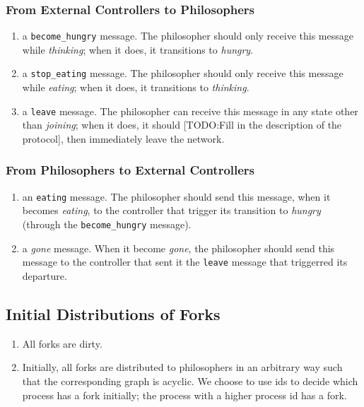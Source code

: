\documentclass[11pt]{article}
\begin{document}
\subsubsection{From External Controllers to Philosophers}
\begin{enumerate}
\item a \texttt{become\_hungry} message. The philosopher should only receive this message while \textit{thinking}; when it does, it transitions to \textit{hungry}.
\item a \texttt{stop\_eating} message. The philosopher should only receive this message while \textit{eating}; when it does, it transitions to \textit{thinking}.
\item a \texttt{leave} message. The philosopher can receive this message in any state other than \textit{joining}; when it does, it should [TODO:Fill in the description of the protocol], then immediately leave the network.
\end{enumerate}

\subsubsection{From Philosophers to External Controllers}
\begin{enumerate}
\item an \texttt{eating} message. The philosopher should send this message, when it becomes \textit{eating}, to the controller that trigger its transition to \textit{hungry} (through the \texttt{become\_hungry} message).
\item a \textit{gone} message. When it become \textit{gone}, the philosopher should send this message to the controller that sent it the \texttt{leave} message that triggerred its departure.
\end{enumerate}

\subsection{Initial Distributions of Forks}
\begin{enumerate}
\item All forks are dirty.
\item Initially, all forks are distributed to philosophers in an arbitrary way such that the corresponding graph is acyclic. We choose to use ids to decide which process has a fork initially; the process with a higher process id has a fork.
\end{enumerate}
\end{document}
